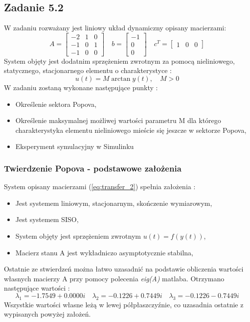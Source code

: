 \documentclass[a4paper,11pt]{article}
\begin{document}
\subsection{Zadanie 5.2}
W zadaniu rozważany jest liniowy układ dynamiczny opisany macierzami: 
\begin{equation}\label{eq:transfer_2}
A = 
\begin{bmatrix}
-2 & 1 & 0 \\
-1 & 0 & 1 \\
-1 & 0 & 0 
\end{bmatrix}
\quad
b = \begin{bmatrix}
-1 \\
0 \\
0 
\end{bmatrix}
\quad
c^{T}=
\begin{bmatrix}
1 & 0 & 0
\end{bmatrix}
\end{equation}
System objęty jest dodatnim sprzężeniem zwrotnym za pomocą nieliniowego, statycznego, stacjonarnego elementu o charakterystyce :
\begin{equation*}
u(t) = M \arctan y(t), \quad M>0
\end{equation*}
\newpage
W zadaniu zostaną wykonane następujące punkty :
\begin{itemize}
\item Określenie sektora Popova,
\item Określenie maksymalnej możliwej wartości parametru M dla którego charakterystyka elementu nieliniowego mieście się jeszcze w sektorze Popova,
\item Eksperyment symulacyjny w Simulinku
\end{itemize}
\subsubsection{Twierdzenie Popova - podstawowe założenia}
System opisany macierzami (\ref{eq:transfer_2}) spełnia założenia :
\begin{itemize}
\item Jest systemem liniowym, stacjonarnym, skończenie wymiarowym,
\item Jest systemem SISO,
\item System objęty jest sprzężeniem zwrotnym \( u(t)=f(y(t)) \), 
\item Macierz stanu A jest wykładniczo asymptotycznie stabilna,
\end{itemize}
Ostatnie ze stwierdzeń można łatwo uzasadnić na podstawie obliczenia wartości własnych macierzy A przy pomocy polecenia \textit{eig(A)} matlaba. Otrzymano następujące wartości :
\begin{equation*}
\lambda_{1} =  -1.7549 + 0.0000i \quad
\lambda_{2} =  -0.1226 + 0.7449i \quad 
\lambda_{3} =  -0.1226 - 0.7449i 
\end{equation*}
Wszystkie wartości własne leżą w lewej półpłaszczyźnie, co uzasadnia ostatnie z wypisanych powyżej założeń.
\end{document}
